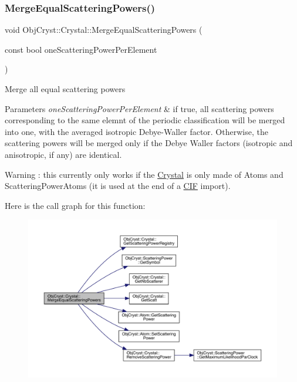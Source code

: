 \subsubsection{\texorpdfstring{MergeEqualScatteringPowers()}{MergeEqualScatteringPowers()}}
{\footnotesize\ttfamily void Obj\+Cryst\+::\+Crystal\+::\+Merge\+Equal\+Scattering\+Powers (\begin{DoxyParamCaption}\item[{const bool}]{one\+Scattering\+Power\+Per\+Element }\end{DoxyParamCaption})}

Merge all equal scattering powers


\begin{DoxyParams}{Parameters}
{\em one\+Scattering\+Power\+Per\+Element} & if true, all scattering powers corresponding to the same elemnt of the periodic classification will be merged into one, with the averaged isotropic Debye-\/\+Waller factor. Otherwise, the scattering powers will be merged only if the Debye Waller factors (isotropic and anisotropic, if any) are identical.\\
\hline
\end{DoxyParams}
\begin{DoxyWarning}{Warning}
\+: this currently only works if the \mbox{\hyperlink{class_obj_cryst_1_1_crystal}{Crystal}} is only made of Atoms and Scattering\+Power\+Atoms (it is used at the end of a \mbox{\hyperlink{class_obj_cryst_1_1_c_i_f}{C\+IF}} import). 
\end{DoxyWarning}
Here is the call graph for this function\+:
\nopagebreak
\begin{figure}[H]
\begin{center}
\leavevmode
\includegraphics[width=350pt]{class_obj_cryst_1_1_crystal_a8cf8ddfad602c6662dd57c8680ad6a67_cgraph}
\end{center}
\end{figure}
\mbox{\label{class_obj_cryst_1_1_crystal_a1cdcbdf36f1a93e86d8e56270ac817ad}} 

